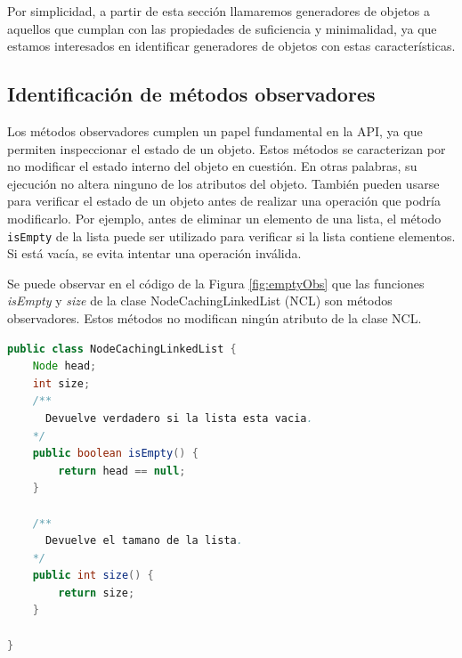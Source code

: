 
Por simplicidad, a partir de esta sección llamaremos generadores de objetos a aquellos que cumplan con las propiedades de suficiencia y minimalidad, ya que estamos interesados en identificar generadores de objetos con estas características.


\subsection{Identificación de métodos observadores}

 Los métodos observadores cumplen un papel fundamental en la API, ya que permiten inspeccionar el estado de un objeto. Estos métodos se caracterizan por no modificar el estado interno del objeto en cuestión. En otras palabras, su ejecución no altera ninguno de los atributos del objeto.
  También pueden usarse para verificar el estado de un objeto antes de realizar una operación que podría modificarlo.
 Por ejemplo, antes de eliminar un elemento de una lista, el método \texttt{isEmpty} de la lista puede ser utilizado para verificar si la lista contiene elementos. Si está vacía, se evita intentar una operación inválida.

Se puede observar en el código de la Figura \ref{fig:emptyObs} que las funciones \emph{isEmpty} y \emph{size} de la clase NodeCachingLinkedList (NCL) son métodos observadores.  Estos métodos no modifican ningún atributo de la clase NCL.
 
\begin{lstlisting}[language=Java, label=fig:emptyObs, caption=Algunos métodos observadores de la clase NCL. Se observa que no modifican el estado de NCL., captionpos=b, frame=tb]
public class NodeCachingLinkedList {
    Node head;
    int size;
    /**
      Devuelve verdadero si la lista esta vacia. 
    */ 
    public boolean isEmpty() { 
        return head == null; 
    }
    
    /**
      Devuelve el tamano de la lista. 
    */ 
    public int size() { 
        return size; 
    }
    
}
\end{lstlisting}


